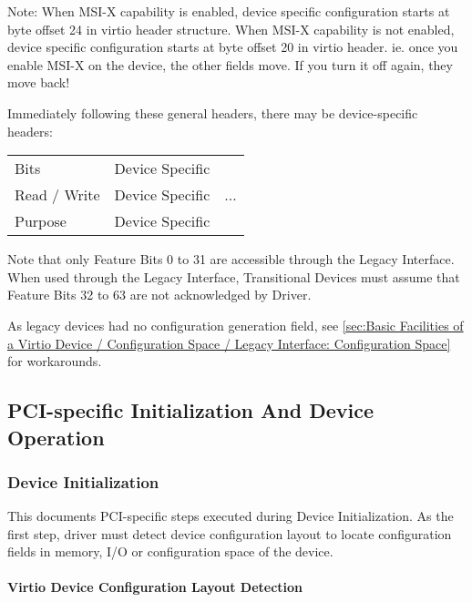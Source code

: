 Note: When MSI-X capability is enabled, device specific configuration starts at
byte offset 24 in virtio header structure. When MSI-X capability is not
enabled, device specific configuration starts at byte offset 20 in virtio
header.  ie. once you enable MSI-X on the device, the other fields move.
If you turn it off again, they move back!

Immediately following these general headers, there may be
device-specific headers:

\begin{tabular}{|l||l|l|}
\hline
Bits & Device Specific & \multirow{3}{*}{...} \\
\cline{1-2}
Read / Write & Device Specific & \\
\cline{1-2}
Purpose & Device Specific & \\
\hline
\end{tabular}

Note that only Feature Bits 0 to 31 are accessible through the
Legacy Interface. When used through the Legacy Interface,
Transitional Devices must assume that Feature Bits 32 to 63
are not acknowledged by Driver.

As legacy devices had no configuration generation field,
see \ref{sec:Basic Facilities of a Virtio Device / Configuration Space / Legacy Interface: Configuration Space}~ for workarounds.

\subsection{PCI-specific Initialization And Device Operation}\label{sec:Virtio Transport Options / Virtio Over PCI Bus / PCI-specific Initialization And Device Operation}

\subsubsection{Device Initialization}\label{sec:Virtio Transport Options / Virtio Over PCI Bus / PCI-specific Initialization And Device Operation / Device Initialization}

This documents PCI-specific steps executed during Device Initialization.
As the first step, driver must detect device configuration layout
to locate configuration fields in memory, I/O or configuration space of the
device.

\paragraph{Virtio Device Configuration Layout Detection}\label{sec:Virtio Transport Options / Virtio Over PCI Bus / PCI-specific Initialization And Device Operation / Device Initialization / Virtio Device Configuration Layout Detection}


